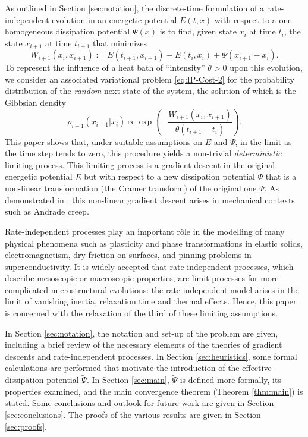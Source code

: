 \documentclass[reqno]{amsart}
\theoremstyle{definition}
\begin{document}
As outlined in Section \ref{sec:notation}, the discrete-time formulation of a rate-independent evolution in an energetic potential $E(t, x)$ with respect to a one-homogeneous dissipation potential $\Psi(x)$ is to find, given state $x_{i}$ at time $t_{i}$, the state $x_{i + 1}$ at time $t_{i + 1}$ that minimizes
\begin{equation}
	\label{eq:intro_work}
	W_{i + 1}(x_{i}, x_{i + 1}) := E(t_{i + 1}, x_{i + 1}) - E(t_{i}, x_{i}) + \Psi(x_{i + 1} - x_{i}).
\end{equation}
To represent the influence of a heat bath of ``intensity'' $\theta > 0$ upon this evolution, we consider an associated variational problem \eqref{eq:IP-Cost-2} for the probability distribution of the \emph{random} next state of the system, the solution of which is the Gibbsian density
\begin{equation}
	\label{eq:intro_Gibbs}
	\rho_{i + 1}(x_{i + 1}|x_{i}) \propto \exp \left( - \frac{W_{i + 1}(x_{i}, x_{i + 1})}{\theta (t_{i + 1} - t_{i})} \right).
\end{equation}
This paper shows that, under suitable assumptions on $E$ and $\Psi$, in the limit as the time step tends to zero, this procedure yields a non-trivial \emph{deterministic} limiting process.  This limiting process is a gradient descent in the original energetic potential $E$ but with respect to a new dissipation potential ${\widetilde{\Psi}}$ that is a non-linear transformation (the Cramer transform) of the original one $\Psi$.  As demonstrated in \cite{Sullivan:2009, SullivanKoslowskiTheilOrtiz:2009}, this non-linear gradient descent arises in mechanical contexts such as Andrade creep.

Rate-independent processes play an important r{\^o}le in the modelling of many physical phenomena such as plasticity and phase transformations in elastic solids, electromagnetism, dry friction on surfaces, and pinning problems in superconductivity.  It is widely accepted that rate-independent processes, which describe mesoscopic or macroscopic properties, are limit processes for more complicated microstructural evolutions:  the rate-independent model arises in the limit of vanishing inertia, relaxation time and thermal effects.  Hence, this paper is concerned with the relaxation of the third of these limiting assumptions.

In Section \ref{sec:notation}, the notation and set-up of the problem are given, including a brief review of the necessary elements of the theories of gradient descents and rate-independent processes.  In Section \ref{sec:heuristics}, some formal calculations are performed that motivate the introduction of the effective dissipation potential ${\widetilde{\Psi}}$.  In Section \ref{sec:main}, ${\widetilde{\Psi}}$ is defined more formally, its properties examined, and the main convergence theorem (Theorem \ref{thm:main}) is stated.  Some conclusions and outlook for future work are given in Section \ref{sec:conclusions}.  The proofs of the various results are given in Section \ref{sec:proofs}.
\end{document}
